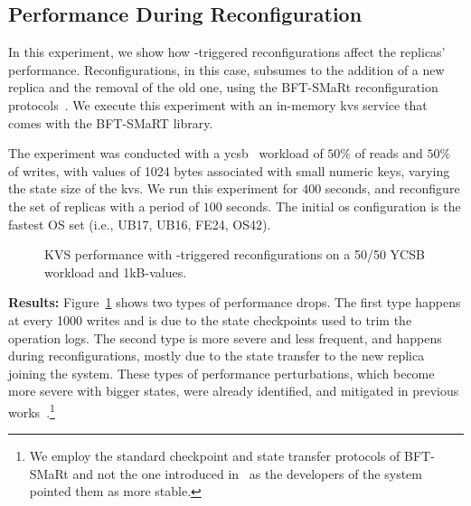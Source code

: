 \subsection{Performance During Reconfiguration}
\label{sec:reconfiguration}



In this experiment, we show how \system-triggered reconfigurations affect the replicas' performance.
Reconfigurations, in this case, subsumes to the addition of a new replica and the removal of the old one, using the BFT-SMaRt reconfiguration protocols~\cite{Bessani:2014}. 
We execute this experiment with an in-memory \gls{kvs} service that comes with the BFT-SMaRT library.

The experiment was conducted with a \gls{ycsb}~\cite{Cooper:2010} workload of $50\%$ of reads and $50\%$ of writes, with values of 1024 bytes associated with small numeric keys, varying the state size of the \gls{kvs}.
We run this experiment for $400$ seconds, and reconfigure the set of replicas with a period of $100$ seconds. 
The initial \gls{os} configuration is the fastest OS set (i.e., UB17, UB16, FE24, OS42).
\begin{figure}[h]
\caption{KVS performance with \system-triggered reconfigurations on a 50/50 YCSB workload and 1kB-values.}
\label{fig:reconfiguration}
\end{figure}



\textbf{Results:}
Figure~\ref{fig:reconfiguration} shows two types of performance drops.
The first type happens at every 1000 writes and is due to the state checkpoints used to trim the operation logs.
The second type is more severe and less frequent, and happens during reconfigurations, mostly due to the state transfer to the new replica joining the system.
These types of performance perturbations, which become more severe with bigger states, were already identified, and mitigated in previous works~\cite{Bessani:2013}.\footnote{We employ the standard checkpoint and state transfer protocols of BFT-SMaRt and not the one introduced in~\cite{Bessani:2013} as the developers of the system pointed them as more stable.} 

